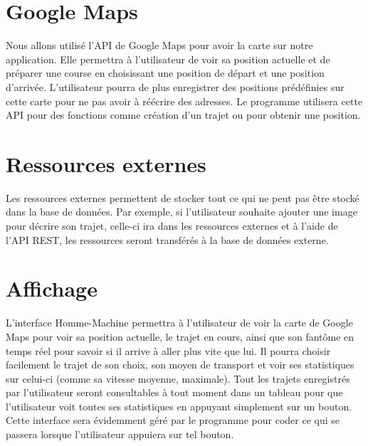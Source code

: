 \section{Google Maps}
Nous allons utilisé l'\gls{API} de Google Maps pour avoir la carte sur notre application.
Elle permettra à l'utilisateur de voir sa position actuelle et de préparer une course en choisissant une position de départ et une position d'arrivée.
L'utilisateur pourra de plus enregistrer des positions prédéfinies sur cette carte pour ne pas avoir à réécrire des adresses.
Le programme utilisera cette \gls{API} pour des fonctions comme création d'un trajet ou pour obtenir une position.


\section{Ressources externes}
Les ressources externes permettent de stocker tout ce qui ne peut pas être stocké dans la base de données.
Par exemple, si l'utilisateur souhaite ajouter une image pour décrire son trajet, celle-ci ira dans les ressources externes et à l'aide de l'\gls{API} REST,
les ressources seront transférés à la base de données externe.


\section{Affichage}
L'interface Homme-Machine permettra à l'utilisateur de voir la carte de Google Maps pour voir sa position actuelle, le trajet en cours,
ainsi que son fantôme en temps réel pour savoir si il arrive à aller plus vite que lui.
Il pourra choisir facilement le trajet de son choix, son moyen de transport et voir ses statistiques sur celui-ci (comme sa vitesse moyenne, maximale).
Tout les trajets enregistrés par l'utilisateur seront consultables à tout moment dans un tableau pour que l'utilisateur voit toutes ses statistiques en appuyant simplement sur un bouton.
Cette interface sera évidemment géré par le programme pour coder ce qui se passera lorsque l'utilisateur appuiera sur tel bouton.